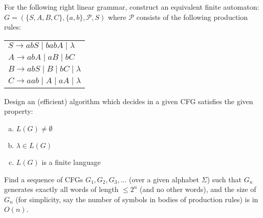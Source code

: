 \documentclass[a4paper,12pt]{amsart}
\begin{document}
\medskip\begin{problem} 
    
    For the following right linear grammar, construct an equivalent finite automaton: $G=(\{S,A,B,C\},\{a,b\},\mathcal P,S)$ where $\mathcal P$ consists of the following production rules:

    \bigskip
        
    \begin{center}
        \begin{tabular}{l}
            $S\rightarrow abS\mid babA\mid \lambda $\\
            $A\rightarrow abA\mid aB \mid  bC$\\
            $B\rightarrow abS\mid B\mid bC\mid \lambda $\\
            $C\rightarrow aab\mid A\mid aA\mid \lambda $
        \end{tabular}
    \end{center}
    
\end{problem}


\medskip\begin{problem}
    
    Design an (efficient) algorithm which decides in a given CFG satisfies the given property:
    
    \medskip

    \begin{enumerate}[(a)]
        \item $L(G)\neq\emptyset$
        \item $\lambda\in L(G)$
        \item $L(G)$ is a finite language
    \end{enumerate}

\end{problem}
    

\medskip\begin{problem}
    
    Find a sequence of CFGs $G_1,G_2,G_3,\dots$ (over a given alphabet $\Sigma$) such that $G_n$ generates exactly all words of length $\leq 2^n$ (and no other words), and the size of $G_n$ (for simplicity, say the number of symbols in bodies of production rules) is in $O(n)$.
    

\end{problem}
\end{document}
